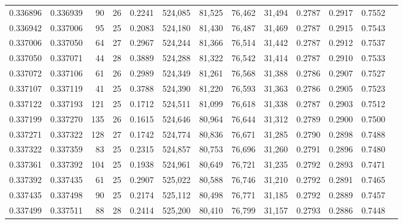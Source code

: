 \begin{tabular}{rrrrrrrrrrrrr}
0.336896 & 0.336939 &    90 &  26 &                                     0.2241 & 524,085 &  81,525 &  76,462 &  31,494 & 0.2787 & 0.2917 & 0.7552 \\
0.336942 & 0.337006 &    95 &  25 &                                     0.2083 & 524,180 &  81,430 &  76,487 &  31,469 & 0.2787 & 0.2915 & 0.7543 \\
0.337006 & 0.337050 &    64 &  27 &                                     0.2967 & 524,244 &  81,366 &  76,514 &  31,442 & 0.2787 & 0.2912 & 0.7537 \\
0.337050 & 0.337071 &    44 &  28 &                                     0.3889 & 524,288 &  81,322 &  76,542 &  31,414 & 0.2787 & 0.2910 & 0.7533 \\
0.337072 & 0.337106 &    61 &  26 &                                     0.2989 & 524,349 &  81,261 &  76,568 &  31,388 & 0.2786 & 0.2907 & 0.7527 \\
0.337107 & 0.337119 &    41 &  25 &                                     0.3788 & 524,390 &  81,220 &  76,593 &  31,363 & 0.2786 & 0.2905 & 0.7523 \\
0.337122 & 0.337193 &   121 &  25 &                                     0.1712 & 524,511 &  81,099 &  76,618 &  31,338 & 0.2787 & 0.2903 & 0.7512 \\
0.337199 & 0.337270 &   135 &  26 &                                     0.1615 & 524,646 &  80,964 &  76,644 &  31,312 & 0.2789 & 0.2900 & 0.7500 \\
0.337271 & 0.337322 &   128 &  27 &                                     0.1742 & 524,774 &  80,836 &  76,671 &  31,285 & 0.2790 & 0.2898 & 0.7488 \\
0.337322 & 0.337359 &    83 &  25 &                                     0.2315 & 524,857 &  80,753 &  76,696 &  31,260 & 0.2791 & 0.2896 & 0.7480 \\
0.337361 & 0.337392 &   104 &  25 &                                     0.1938 & 524,961 &  80,649 &  76,721 &  31,235 & 0.2792 & 0.2893 & 0.7471 \\
0.337392 & 0.337435 &    61 &  25 &                                     0.2907 & 525,022 &  80,588 &  76,746 &  31,210 & 0.2792 & 0.2891 & 0.7465 \\
0.337435 & 0.337498 &    90 &  25 &                                     0.2174 & 525,112 &  80,498 &  76,771 &  31,185 & 0.2792 & 0.2889 & 0.7457 \\
0.337499 & 0.337511 &    88 &  28 &                                     0.2414 & 525,200 &  80,410 &  76,799 &  31,157 & 0.2793 & 0.2886 & 0.7448 \\

\end{tabular}
